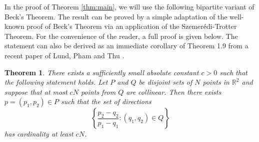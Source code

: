 \documentclass[11pt,oneside]{amsart}
\numberwithin{exercise}{subsection}
\newtheorem{theorem}{Theorem}
\begin{document}
In the proof of Theorem \ref{thm:main}, we will use the following bipartite variant of Beck's Theorem. The result can be proved by a simple adaptation of the well-known proof of Beck's Theorem via an application of the Szemer\'{e}di-Trotter Theorem. For the convenience of the reader, a full proof is given below. The statement can also be derived as an immediate corollary of Theorem 1.9 from a recent paper of Lund, Pham and Thu \cite{LPT}.

\begin{theorem} \label{thm:beck}
There exists a sufficiently small absolute constant $c>0$ such that the following statement holds. Let $P$ and $Q$ be disjoint sets of $N$ points in $\mathbb R^2$ and suppose that at most $cN$ points from $Q$ are collinear. Then there exists $p=(p_1,p_2) \in P$ such that the set of directions
\[
\left \{ \frac{p_2-q_2}{p_1-q_1} : (q_1,q_2) \in Q \right \}
\]
has cardinality at least $cN$.
\end{theorem}
\end{document}
